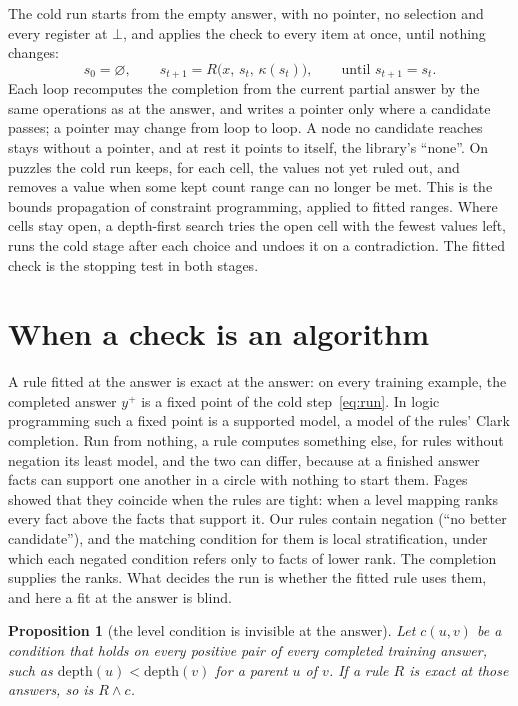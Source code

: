 \documentclass[10pt]{article}
\newtheorem{proposition}{Proposition}
\newcommand{\notyet}{\bot}
\begin{document}
The cold run starts from the empty answer, with no pointer, no selection and every register at $\notyet$, and applies
the check to every item at once, until nothing changes:
\begin{equation}
s_0 = \varnothing, \qquad s_{t+1} = R\bigl(x,\, s_t,\, \kappa(s_t)\bigr), \qquad \text{until } s_{t+1} = s_t .
\label{eq:run}
\end{equation}
Each loop recomputes the completion from the current partial answer by the same operations as at the answer, and writes
a pointer only where a candidate passes; a pointer may change from loop to loop. A node no candidate reaches stays
without a pointer, and at rest it points to itself, the library's ``none''. On puzzles the cold run keeps, for each cell,
the values not yet ruled out, and removes a value when some kept count range can no longer be met. This is the bounds
propagation of constraint programming\cite{rossi2006handbook}, applied to fitted ranges. Where cells stay open, a
depth-first search tries the open cell with the fewest values left, runs the cold stage after each choice and undoes it
on a contradiction. The fitted check is the stopping test in both stages.
\section{When a check is an algorithm}\label{sec:theory}

A rule fitted at the answer is exact at the answer: on every training example, the completed answer $y^{+}$ is a fixed
point of the cold step~\eqref{eq:run}. In logic programming such a fixed point is a supported model, a model of the
rules' Clark completion\cite{clark1978negation}. Run from nothing, a rule computes something else, for rules without
negation its least model, and the two can differ, because at a finished answer facts can support one another in a
circle with nothing to start them. Fages showed that they coincide when the rules are tight: when a level mapping ranks
every fact above the facts that support it\cite{fages1994consistency}. Our rules contain negation (``no better
candidate''), and the matching condition for them is local stratification, under which each negated condition refers
only to facts of lower rank\cite{apt1988towards}. The completion supplies the ranks. What decides the run is whether the
fitted rule uses them, and here a fit at the answer is blind.

\begin{proposition}[the level condition is invisible at the answer]\label{prop:invisible}
Let $c(u,v)$ be a condition that holds on every positive pair of every completed training answer, such as
$\mathrm{depth}(u) < \mathrm{depth}(v)$ for a parent $u$ of $v$. If a rule $R$ is exact at those answers, so is
$R \wedge c$.
\end{proposition}
\end{document}
